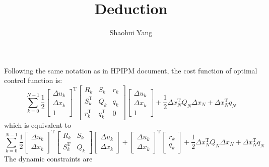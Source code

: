 \documentclass{article}%
\title{\textbf{Deduction}}
\author{Shaohui Yang}
\newcommand{\tp}{^{\mathrm{T}}}
\begin{document}
\maketitle

\section{}
Following the same notation as in HPIPM document, the cost function of optimal control function is: 
\begin{equation}
	\sum_{k=0}^{N-1} \frac{1}{2} 
	\begin{bmatrix}
	\Delta u_k \\
	\Delta x_k \\
	1
	\end{bmatrix}\tp 
	\begin{bmatrix}
	R_k & S_k & r_k \\
	S_k\tp & Q_k & q_k \\
	r_k\tp & q_k\tp & 0
	\end{bmatrix}
	\begin{bmatrix}
	\Delta u_k \\
	\Delta x_k \\
	1
	\end{bmatrix}
	+ \frac{1}{2}\Delta x_N\tp Q_N \Delta x_N + \Delta x_N\tp q_N
\end{equation}
which is equivalent to 
\begin{equation}
	\sum_{k=0}^{N-1} \frac{1}{2} 
	\begin{bmatrix}
	\Delta u_k \\
	\Delta x_k
	\end{bmatrix}\tp 
	\begin{bmatrix}
	R_k & S_k \\
	S_k\tp & Q_k
	\end{bmatrix}
	\begin{bmatrix}
	\Delta u_k \\
	\Delta x_k 
	\end{bmatrix} + 
	\begin{bmatrix}
	\Delta u_k \\
	\Delta x_k 
	\end{bmatrix}\tp 
	\begin{bmatrix}
	r_k \\
	q_k 
	\end{bmatrix} + 
	\frac{1}{2}\Delta x_N\tp Q_N \Delta x_N + \Delta x_N\tp q_N
\end{equation}
The dynamic constraints are 
\end{document}
